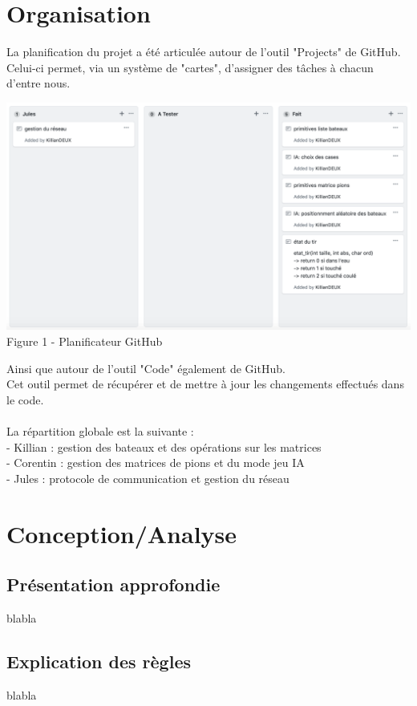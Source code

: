 \documentclass[a4paper,12pt]{article}
\begin{document}
\newpage
\section {Organisation}
La planification du projet a été articulée autour de l'outil "Projects" de GitHub.\\
Celui-ci permet, via un système de "cartes", d'assigner des tâches à chacun d'entre nous.\\
\begin{center}
  \includegraphics[width=1\textwidth] {capture_projects.png}  
  Figure 1 - Planificateur GitHub 
\end{center}
Ainsi que autour de l'outil "Code"  également de GitHub.\\
Cet outil permet de récupérer et de mettre à jour les changements effectués dans le code.\\
\\
La répartition globale est la suivante : \\
- Killian : gestion des bateaux et des opérations sur les matrices \\
- Corentin : gestion des matrices de pions et du mode jeu IA \\
- Jules : protocole de communication et gestion du réseau \\



\newpage
\section {Conception/Analyse}
\subsection {Présentation approfondie}
blabla
\newpage
\subsection {Explication des règles}
blabla
\end{document}
